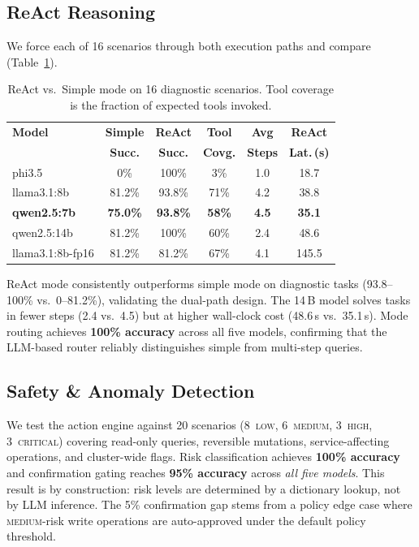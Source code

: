 \documentclass[sigplan,nonacm,10pt]{acmart}
\begin{document}
\subsection{ReAct Reasoning}\label{ss:reacteval}

We force each of 16 scenarios through both execution paths
and compare (Table~\ref{tab:react}).

\begin{table}[t]
\centering\small
\caption{ReAct vs.\ Simple mode on 16 diagnostic scenarios.
Tool coverage is the fraction of expected tools invoked.}
\label{tab:react}
\begin{tabular}{@{}lccccc@{}}
\toprule
\textbf{Model} & \textbf{Simple} & \textbf{ReAct} & \textbf{Tool} & \textbf{Avg} & \textbf{ReAct} \\
& \textbf{Succ.} & \textbf{Succ.} & \textbf{Covg.} & \textbf{Steps} & \textbf{Lat.\,(s)} \\
\midrule
phi3.5       &   0\%  & 100\% &  3\% & 1.0 & 18.7 \\
llama3.1:8b  & 81.2\% & 93.8\% & 71\% & 4.2 & 38.8 \\
\textbf{qwen2.5:7b}  & \textbf{75.0\%} & \textbf{93.8\%} & \textbf{58\%} & \textbf{4.5} & \textbf{35.1} \\
qwen2.5:14b  & 81.2\% & 100\% & 60\% & 2.4 & 48.6 \\
llama3.1:8b-fp16 & 81.2\% & 81.2\% & 67\% & 4.1 & 145.5 \\
\bottomrule
\end{tabular}
\end{table}

ReAct mode consistently outperforms simple mode on diagnostic tasks
(93.8--100\% vs.\ 0--81.2\%), validating the dual-path design.
The 14\,B model solves tasks in fewer steps (2.4 vs.\ 4.5) but at
higher wall-clock cost (48.6\,s vs.\ 35.1\,s).
Mode routing achieves \textbf{100\% accuracy} across all five
models, confirming that the LLM-based router reliably distinguishes
simple from multi-step queries.

\subsection{Safety \& Anomaly Detection}\label{ss:safetyeval}\label{ss:anomalyeval}

We test the action engine against 20 scenarios
(8~\textsc{low}, 6~\textsc{medium}, 3~\textsc{high},
3~\textsc{critical}) covering read-only queries, reversible
mutations, service-affecting operations, and cluster-wide flags.
Risk classification achieves \textbf{100\% accuracy} and confirmation
gating reaches \textbf{95\% accuracy} across \emph{all five models}.
This result is by construction: risk levels are determined by a
dictionary lookup, not by LLM inference.
The 5\% confirmation gap stems from a policy edge case where
\textsc{medium}-risk write operations are auto-approved under the default
policy threshold.
\end{document}
